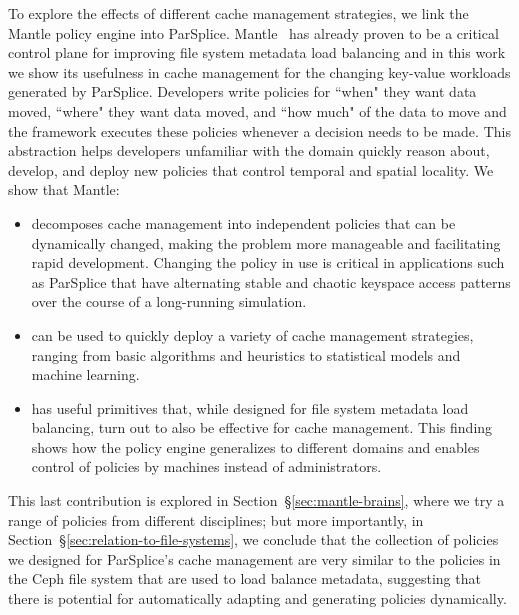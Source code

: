 To explore the effects of different cache management strategies, we link the
Mantle policy engine into ParSplice.  Mantle~\cite{sevilla:sc15-mantle} has
already proven to be a critical control plane for improving file system
metadata load balancing  and in this work we show its usefulness in cache
management for the changing key-value workloads generated by ParSplice.
Developers write policies for ``when" they want data moved, ``where" they want
data moved, and ``how much" of the data to move and the framework executes
these policies whenever a decision needs to be made.  This abstraction helps
developers unfamiliar with the domain quickly reason about, develop, and deploy
new policies that control temporal and spatial locality. We show that Mantle:

\begin{itemize}

  \item decomposes cache management into independent policies that can be
  dynamically changed, making the problem more manageable and facilitating rapid
  development. Changing the policy in use is critical in applications such as
  ParSplice that have alternating stable and chaotic keyspace access patterns
  over the course of a long-running simulation.  

  \item can be used to quickly deploy a variety of cache management strategies,
  ranging from basic algorithms and heuristics to statistical models and machine
  learning.

  \item has useful primitives that, while designed for file system metadata
  load balancing, turn out to also be effective for cache management. This
  finding shows how the policy engine generalizes to different domains and
  enables control of policies by machines instead of administrators.

\end{itemize}


This last contribution is explored in Section~\S\ref{sec:mantle-brains}, where
we try a range of policies from different disciplines; but more importantly, in
Section~\S\ref{sec:relation-to-file-systems}, we conclude that the collection
of policies we designed for ParSplice's cache management are very similar to
the policies in the Ceph file system that are used to load balance metadata,
suggesting that there is potential for automatically adapting and generating
policies dynamically. 


